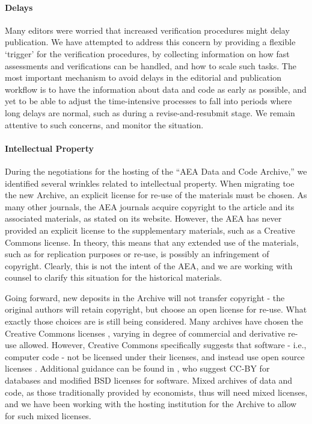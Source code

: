 \documentclass[AEJ]{AEA}
\begin{document}
\paragraph{Delays} Many editors were worried that increased verification procedures might delay publication. We have attempted to address this concern by providing a flexible `trigger' for the verification procedures, by collecting information on how fast assessments and verifications can be handled, and how to scale such tasks. The most important mechanism to avoid delays in the editorial and publication workflow is to have the information about data and code as early as possible, and yet to be able to adjust the time-intensive processes to fall into periods where long delays are normal, such as during a revise-and-resubmit stage. We remain attentive to such concerns, and monitor the situation.

\paragraph{Intellectual Property} During the negotiations for the hosting of the ``AEA Data and Code Archive,'' we identified several wrinkles related to intellectual property. When migrating toe the new Archive, an explicit license for re-use of the materials must be chosen. As many other journals, the AEA journals acquire copyright to the article and its associated materials, as stated on its website. However, the AEA has never provided an explicit license to the supplementary materials, such as a Creative Commons license. In theory, this means that any extended use of the materials, such as for replication purposes or re-use, is possibly an infringement of copyright. Clearly, this is not the intent of the AEA, and we are working with counsel to clarify this situation for the historical materials. 

Going forward, new deposits in the Archive will not transfer copyright - the original authors will retain copyright, but choose an open license for re-use. What exactly those choices are is still being considered. Many archives have chosen the Creative Commons licenses \cite{CreativeCommons2017}, varying in degree of commercial and derivative re-use allowed. However, Creative Commons specifically suggests that software - i.e., computer code - not be licensed under their licenses, and instead use open source licenses \cite{OpenSourceInitiative2018}. Additional guidance can be found in \cite{StoddenSoftwarePatentsBarrier2012}, who suggest CC-BY for databases and modified BSD licenses for software.  Mixed archives of data and code, as those traditionally provided by economists, thus will need mixed licenses, and we have been working with the hosting institution for the Archive to allow for such mixed licenses. 
\end{document}
